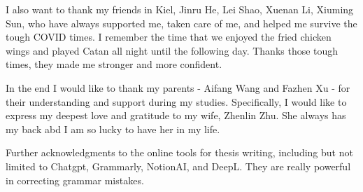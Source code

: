 I also want to thank my friends in Kiel, Jinru He, Lei Shao, Xuenan Li, Xiuming Sun, who have always supported me, taken care of me, and helped me survive the tough COVID times. I remember the time that we enjoyed the fried chicken wings and played Catan all night until the following day. Thanks those tough times, they made me stronger and more confident.

In the end I would like to thank my parents - Aifang Wang and Fazhen Xu - for their understanding and support during my studies. 
Specifically, I would like to express my deepest love and gratitude to my wife, Zhenlin Zhu. She always has my back abd I am so lucky to have her in my life.


Further acknowledgments to the online tools for thesis writing, including but not limited to Chatgpt, Grammarly, NotionAI, and DeepL. They are really powerful in correcting grammar mistakes.
 





